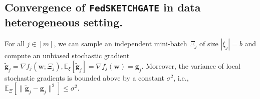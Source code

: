 \subsection{Convergence of  \texttt{FedSKETCHGATE} in data heterogeneous setting.} 
\begin{assumption}\label{Assu:2}
For all $j\in [m]$, we can sample an independent mini-batch $\Xi_j$   of size $|{\xi}_j| = b$ and compute an unbiased stochastic gradient $\tilde{\mathbf{g}}_j = \nabla f_j(\boldsymbol{w}; \Xi_j), \mathbb{E}_{\xi}[\tilde{\mathbf{g}}_j] = \nabla f_{j}(\boldsymbol{w})={\mathbf{g}}_j$. Moreover, the variance of local stochastic gradients is bounded above by a constant $\sigma^2$, i.e., $
\mathbb{E}_{\Xi}\left[\|\tilde{\mathbf{g}}_j-{\mathbf{g}}_j\|^2\right]\leq \sigma^2$.
\end{assumption}

